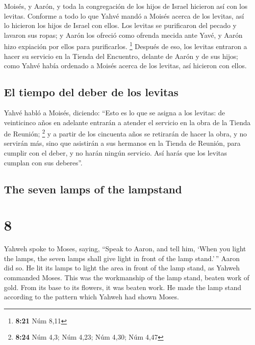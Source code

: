 \begin{paracol}{2}
 Moisés, y Aarón, y toda la congregación de los hijos de
Israel hicieron así con los levitas. Conforme a todo lo que Yahvé mandó
a Moisés acerca de los levitas, así lo hicieron los hijos de Israel con
ellos.  Los levitas se purificaron del pecado y lavaron
sus ropas; y Aarón los ofreció como ofrenda mecida ante Yavé, y Aarón
hizo expiación por ellos para purificarlos. \footnote{\textbf{8:21} Núm
  8,11}  Después de eso, los levitas entraron a hacer su
servicio en la Tienda del Encuentro, delante de Aarón y de sus hijos;
como Yahvé había ordenado a Moisés acerca de los levitas, así hicieron
con ellos.

\hypertarget{el-tiempo-del-deber-de-los-levitas}{%
\subsection{El tiempo del deber de los
levitas}\label{el-tiempo-del-deber-de-los-levitas}}

 Yahvé habló a Moisés, diciendo:  ``Esto
es lo que se asigna a los levitas: de veinticinco años en adelante
entrarán a atender el servicio en la obra de la Tienda de Reunión;
\footnote{\textbf{8:24} Núm 4,3; Núm 4,23; Núm 4,30; Núm 4,47}
 y a partir de los cincuenta años se retirarán de hacer
la obra, y no servirán más,  sino que asistirán a sus
hermanos en la Tienda de Reunión, para cumplir con el deber, y no harán
ningún servicio. Así harás que los levitas cumplan con sus deberes''.

\switchcolumn
\begin{otherlanguage}{english}

\hypertarget{the-seven-lamps-of-the-lampstand}{%
\subsection{The seven lamps of the
lampstand}\label{the-seven-lamps-of-the-lampstand}}

\hypertarget{section-15}{%
\section{8}\label{section-15}}

 Yahweh spoke to Moses, saying,  ``Speak to
Aaron, and tell him, `When you light the lamps, the seven lamps shall
give light in front of the lamp stand.'\,''  Aaron did so.
He lit its lamps to light the area in front of the lamp stand, as Yahweh
commanded Moses.  This was the workmanship of the lamp
stand, beaten work of gold. From its base to its flowers, it was beaten
work. He made the lamp stand according to the pattern which Yahweh had
shown Moses.


\end{otherlanguage}
\end{paracol}
